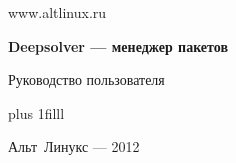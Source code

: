 
\Large
\thispagestyle{empty}
\begin{center}

www.altlinux.ru

\vspace{4cm}

{\LARGE \bf Deepsolver --- менеджер пакетов}

\vspace{1.0cm}

Руководство пользователя

\end{center}

\vskip 0pt plus 1filll

\begin{center}
Альт~Линукс --- 2012
\end{center}
